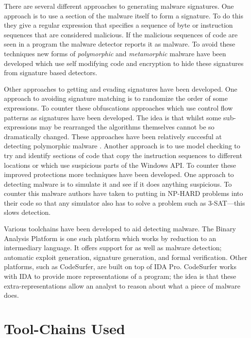 \documentclass[10pt,]{book}
\begin{document}
There are several different approaches to generating malware signatures.
One approach is to use a section of the malware itself to form a
signature. To do this they give a regular expression that specifies a
sequence of byte or instruction sequences that are considered malicious.
If the malicious sequences of code are seen in a program the malware
detector reports it as malware. To avoid these techniques new forms of
\emph{polymorphic} and \emph{metamorphic} malware have been developed
which use self modifying code and encryption to hide these signatures
from signature based detectors\autocite{Christodorescu:2005vf}.

Other approaches to getting and evading signatures have been developed.
One approach to avoiding signature matching is to randomize the order of
some
expressions\autocite{Borello:2008vx}\autocite{Christodorescu:2005vf}. To
counter these obfuscations approaches which use control flow patterns as
signatures have been developed\autocite{Bonfante:2007th}. The idea is
that whilst some sub-expressions may be rearranged the algorithms
themselves cannot be so dramatically changed. These approaches have been
relatively succesful at detecting polymorphic malware
\autocite{Kang:2011bs}\autocite{Bruschi:vb}. Another approach is to use
model checking to try and identify sections of code that copy the
instruction sequences to different locations or which use suspicious
parts of the Windows API\autocite{Kinder:2005hu}. To counter these
improved protections more techniques have been developed. One approach
to detecting malware is to simulate it and see if it does anything
suspicious. To counter this malware authors have taken to putting in
NP-HARD problems into their code so that any simulator also has to solve
a problem such as 3-SAT\autocite{Moser:2007cd}---this slows detection.

Various toolchains have been developed to aid detecting malware. The
Binary Analysis Platform\autocite{Brumley:wn} is one such platform which
works by reduction to an intermediary language. It offers support for as
well as malware detection; automatic exploit
generation\autocite{Avgerinos:vo}, signature generation, and formal
verification. Other platforms, such as
CodeSurfer\autocite{Balakrishnan:2005tx}, are built on top of IDA
Pro\autocite{HexRays:up}. CodeSurfer works with IDA to provide more
representations of a program; the idea is that these
extra-representations allow an analyst to reason about what a piece of
malware does.

\section{Tool-Chains Used}
\end{document}

